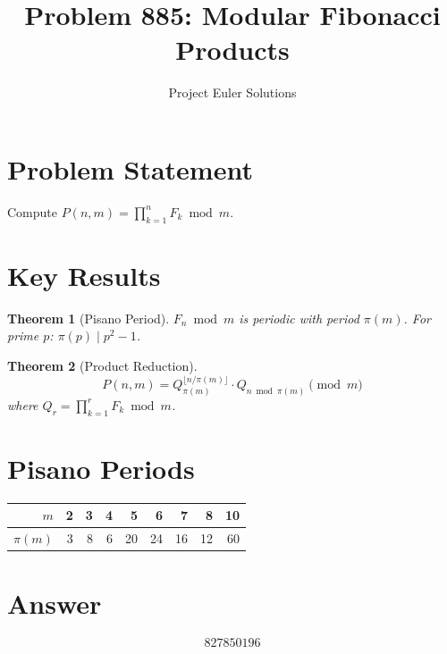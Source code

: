 \documentclass[11pt]{article}
\title{Problem 885: Modular Fibonacci Products}
\author{Project Euler Solutions}
\date{}
\newtheorem{theorem}{Theorem}
\begin{document}
\maketitle

\section{Problem Statement}
Compute $P(n,m) = \prod_{k=1}^{n} F_k \bmod m$.

\section{Key Results}

\begin{theorem}[Pisano Period]
$F_n \bmod m$ is periodic with period $\pi(m)$. For prime $p$: $\pi(p) \mid p^2 - 1$.
\end{theorem}

\begin{theorem}[Product Reduction]
\[
P(n, m) = Q_{\pi(m)}^{\lfloor n/\pi(m)\rfloor} \cdot Q_{n \bmod \pi(m)} \pmod{m}
\]
where $Q_r = \prod_{k=1}^{r} F_k \bmod m$.
\end{theorem}

\section{Pisano Periods}
\begin{center}
\begin{tabular}{r|rrrrrrrr}
$m$ & 2 & 3 & 4 & 5 & 6 & 7 & 8 & 10 \\ \hline
$\pi(m)$ & 3 & 8 & 6 & 20 & 24 & 16 & 12 & 60
\end{tabular}
\end{center}

\section{Answer}

\[
\boxed{827850196}
\]
\end{document}

